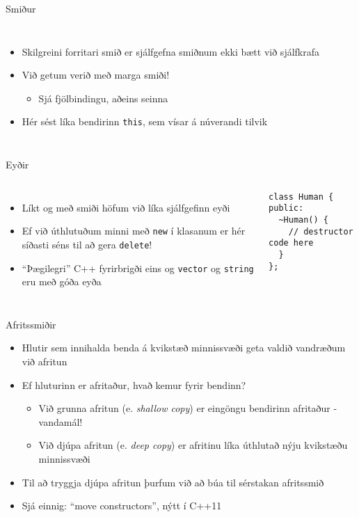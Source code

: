 \documentclass[handout]{beamer}
\begin{document}
\begin{frame}{Smiður}
\begin{columns}
\begin{itemize}
 \item Skilgreini forritari smið er sjálfgefna smiðnum ekki bætt við sjálfkrafa
 \item Við getum verið með marga smiði!
 \begin{itemize}
  \item Sjá fjölbindingu, aðeins seinna
 \end{itemize}
 \item Hér sést líka bendirinn \texttt{this}, sem vísar á núverandi tilvik
\end{itemize}
\end{columns}
\end{frame}

\begin{frame}[fragile]{Eyðir}
\begin{columns}
\begin{itemize}
 \item Líkt og með smiði höfum við líka sjálfgefinn eyði
 \item Ef við úthlutuðum minni með \texttt{new} í klasanum er hér síðasti séns til að gera \texttt{delete}!
 \item ``Þægilegri'' C++ fyrirbrigði eins og \texttt{vector} og \texttt{string} eru með góða eyða
\end{itemize}
\begin{verbatim}
class Human {
public:
  ~Human() {
    // destructor code here
  }
};
\end{verbatim}
\end{columns}
\end{frame}

\begin{frame}{Afritssmiðir}
\begin{itemize}
 \item Hlutir sem innihalda benda á kvikstæð minnissvæði geta valdið vandræðum við afritun
 \item Ef hluturinn er afritaður, hvað kemur fyrir bendinn?
 \begin{itemize}
  \item Við grunna afritun (e. \emph{shallow copy}) er eingöngu bendirinn afritaður - vandamál!
  \item Við djúpa afritun (e. \emph{deep copy}) er afritinu líka úthlutað nýju kvikstæðu minnissvæði
 \end{itemize}
 \item Til að tryggja djúpa afritun þurfum við að búa til sérstakan afritssmið
 \item Sjá einnig: ``move constructors'', nýtt í C++11
\end{itemize}
\end{frame}
\end{document}
